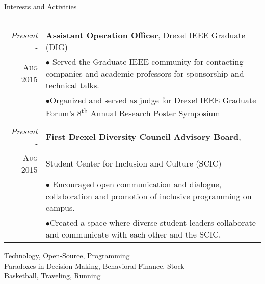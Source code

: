 \begin{vita}
{\Large\scshape\raggedright{Interests and Activities}}
\newline
\rule{\textwidth}{1pt}
\begin{tabular}{r|p{11cm}}  
\emph{Present -} & \textbf{Assistant Operation Officer}, Drexel IEEE Graduate (DIG) \\
\textsc{Aug} 2015 & \footnotesize{$\bullet$ Served the Graduate IEEE community for contacting companies and academic professors for sponsorship and technical talks.} \\
& \footnotesize{$\bullet$Organized and served as judge for Drexel IEEE Graduate Forum's 8\textsuperscript{th} Annual Research Poster Symposium }\\
 \multicolumn{2}{c}{} \\
\emph{Present -} & \textbf{First Drexel Diversity Council Advisory Board}, \\ 
\textsc{Aug} 2015 & Student Center for Inclusion and Culture (SCIC)\\
& \footnotesize{$\bullet$ Encouraged open communication and dialogue, collaboration and promotion of inclusive programming on campus.} \\
& \footnotesize{$\bullet$Created a space where diverse student leaders collaborate and communicate with each other and the SCIC.} \\
\end{tabular}
\vspace{5mm}

Technology, Open-Source, Programming\\
Paradoxes in Decision Making, Behavioral Finance, Stock\\
Basketball, Traveling, Running

\end{vita}
